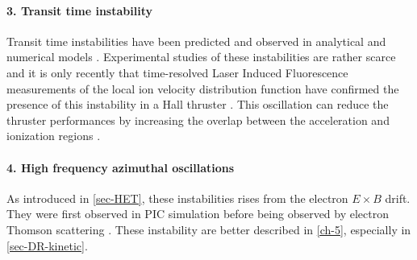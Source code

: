 \paragraph{3. Transit time instability\\}
Transit time instabilities have been predicted and observed in analytical and numerical models \citep{barral2005,boeuf2018}.
Experimental studies of these instabilities are rather scarce and it is only recently that time-resolved Laser Induced Fluorescence measurements of the local ion velocity distribution function have confirmed the presence of this instability in a Hall thruster \citep{vaudolon2015}.
This oscillation can reduce the thruster performances by increasing the overlap between the acceleration and ionization regions \citep{boeuf2018}.

\paragraph{4. High frequency azimuthal oscillations\\}
As introduced in \cref{sec-HET}, these instabilities rises from the electron $E\times B$ drift.
They were first observed in \ac{PIC} simulation \citep{adam2004,ducrocq2006,adam2008a,heron2013} before being observed by electron Thomson scattering \citep{tsikata2009a,tsikata2009,tsikata2013}.
These instability are better described in \cref{ch-5}, especially in \cref{sec-DR-kinetic}.
